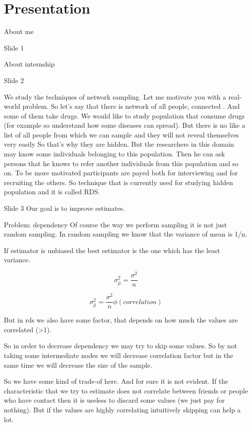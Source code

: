 \documentclass[12pt]{report}
\begin{document}
\chapter{Presentation}


About me

Slide 1

About internship

Slide 2

We study the techniques of network sampling. Let me motivate you with a real-world problem. So let's say that there is network of all people, connected . And some of them take drugs. We would like to study population that consume drugs (for example so understand how some diseases can spread). But there is no like a list of all people from which we can sample and they will not reveal themselves very easily So that's why they are hidden. But the researchers in this domain may know some individuals belonging to this population. Then he can ask persons that he knows to refer another individuals from this population and so on. 
To be more motivated participants are payed both for interviewing and for recruiting the others.
So technique that is currently used for studying hidden population and it is called RDS.


Slide 3
Our goal is to improve estimates.

Problem: dependency
Of course the way we perform sampling it is not just random sampling. In random sampling we know that the variance of mean is 1/n. 

If estimator is unbiased the best estimator is the one which has the least variance.

$$ \sigma_{\hat{\mu}}^2 = \frac{\sigma^2}{n}$$

$$ \sigma_{\hat{\mu}}^2 = \frac{\sigma^2}{n}\phi(correlation)$$

But in rds we also have some factor, that depends on how much the values are correlated (>1).
 
So in order to decrease dependency we may try to skip some values. So by not taking some intermediate nodes we will decrease correlation factor but in the same time we will decrease the size of the sample.


So we have some kind of trade-of here. And for sure it is not evident. If the characteristic that we try to estimate does not correlate between friends or people who have contact then it is useless to discard some values (we just pay for nothing). But if the values are highly correlating intuitively skipping can help a lot.
\end{document}
